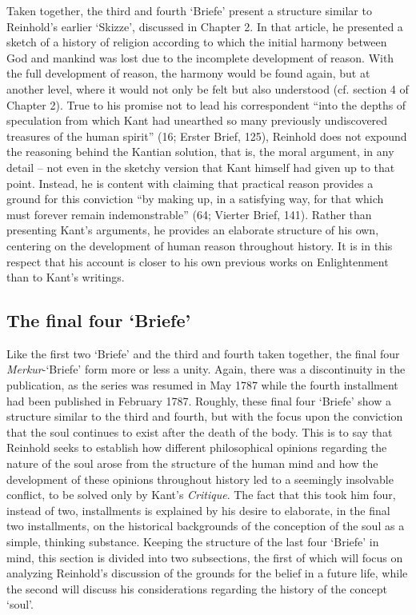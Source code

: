 Taken together, the third and fourth `Briefe' present a structure similar to Reinhold's earlier `Skizze', discussed in Chapter 2. In that article, he presented a sketch of a history of religion according to which the initial harmony between God and mankind was lost due to the incomplete development of reason. With the full development of reason, the harmony would be found again, but at another level, where it would not only be felt but also understood (cf. section 4 of Chapter 2). True to his promise not to lead his correspondent ``into the depths of speculation from which Kant had unearthed so many previously undiscovered treasures of the human spirit'' (16; Erster Brief, 125), Reinhold does not expound the reasoning behind the Kantian solution, that is, the moral argument, in any detail {--} not even in the sketchy version that Kant himself had given up to that point. Instead, he is content with claiming that practical reason provides a ground for this conviction ``by making up, in a satisfying way, for that which must forever remain indemonstrable'' (64; Vierter Brief, 141). Rather than presenting Kant's arguments, he provides an elaborate structure of his own, centering on the development of human reason throughout history. It is in this respect that his account is closer to his own previous works on Enlightenment than to Kant's writings. 


\subsection{The final four `Briefe'}


Like the first two `Briefe' and the third and fourth taken together, the final four \textit{Merkur}{-}`Briefe' form more or less a unity. Again, there was a discontinuity in the publication, as the series was resumed in May 1787 while the fourth installment had been published in February 1787. Roughly, these final four `Briefe' show a structure similar to the third and fourth, but with the focus upon the conviction that the soul continues to exist after the death of the body. This is to say that Reinhold seeks to establish how different philosophical opinions regarding the nature of the soul arose from the structure of the human mind and how the development of these opinions throughout history led to a seemingly insolvable conflict, to be solved only by Kant's \textit{Critique}. The fact that this took him four, instead of two, installments is explained by his desire to elaborate, in the final two installments, on the historical backgrounds of the conception of the soul as a simple, thinking substance. Keeping the structure of the last four `Briefe' in mind, this section is divided into two subsections, the first of which will focus on analyzing Reinhold's discussion of the grounds for the belief in a future life, while the second will discuss his considerations regarding the history of the concept `soul'.


